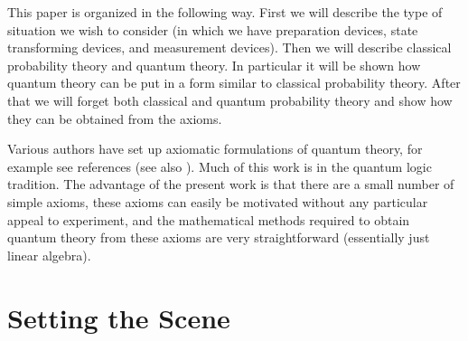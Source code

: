 \documentclass[12pt]{article}
\begin{document}
This paper is organized in the following way.  First we will describe
the type of situation we wish to consider (in which we have preparation
devices, state transforming devices, and measurement devices).  Then we
will describe classical probability theory and quantum
theory.  In particular it will be shown how quantum theory can be put in
a form similar to classical probability theory.  After that we will
forget both classical and quantum probability theory and show how they
can be obtained from the axioms.

Various authors have set up axiomatic formulations of quantum
theory, for example see references
\cite{birkoff,mackey,piron,ludwig,mielnik,lande,fivel,accardi,landsman,cmw}
(see
also \cite{gleason,kochen,pitowsky}). Much of this work is in the quantum logic
tradition.  The advantage of the present work is that there
are a small number of simple axioms, these axioms can easily
be motivated without any particular appeal to experiment,
and the mathematical methods required to obtain quantum theory from
these axioms are very straightforward (essentially just linear algebra).



\section{Setting the Scene}
\end{document}
